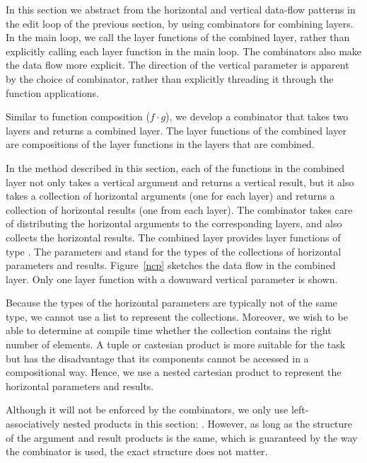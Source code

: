 \documentclass[preprint,natbib]{sigplanconf}
\begin{document}
In this section we abstract from the horizontal and vertical data-flow patterns in the edit loop of the previous section, by using combinators for combining layers. In the main loop, we call the layer functions of the combined layer, rather than explicitly calling each layer function in the main loop. The combinators also make the data flow more explicit. The direction of the vertical parameter is apparent by the choice of combinator, rather than explicitly threading it through the function applications.

Similar to function composition ($f \cdot g$), we develop a  combinator that takes two layers and returns a combined layer. The layer functions of the combined layer are compositions of the layer functions in the layers that are combined.

In the method described in this section, each of the functions in the combined layer not only takes a vertical argument and returns a vertical result, but it also takes a collection of horizontal arguments (one for each layer) and returns a collection of horizontal results (one from each layer). The  combinator takes care of distributing the horizontal arguments to the corresponding layers, and also collects the horizontal results. The combined layer provides layer functions of type . The parameters  and  stand for the types of the collections of horizontal parameters and results. Figure~\ref{ncp} sketches the data flow in the combined layer. Only one layer function with a downward vertical parameter is shown.

Because the types of the horizontal parameters are typically not of the same type, we cannot use a list to represent the collections. Moreover, we wish to be able to determine at compile time whether the collection contains the right number of elements. A tuple or castesian product is more suitable for the task but has the disadvantage that its components cannot be accessed in a compositional way. Hence, we use a nested cartesian product to represent the horizontal parameters and results. 

Although it will not be enforced by the combinators, we only use left-associatively nested products in this section: 
. However, as long as the structure of the argument and result products is the same, which is guaranteed by the way the  combinator is used, the exact structure does not matter.
\end{document}
